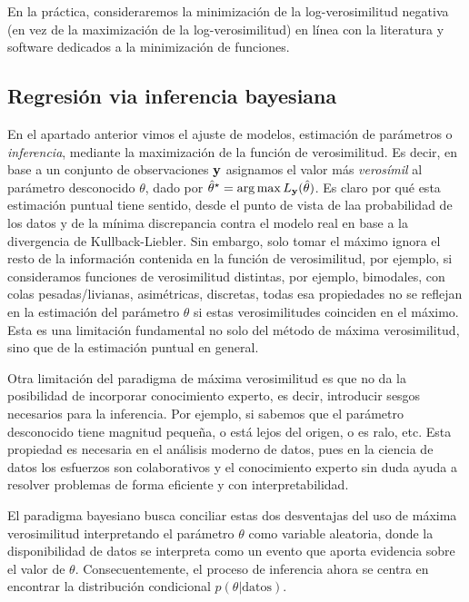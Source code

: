 En la práctica, consideraremos la minimización de la log-verosimilitud negativa (en vez de la maximización de la log-verosimilitud) en línea con la literatura y software dedicados a la minimización de funciones. 

\subsection{Regresión via inferencia bayesiana} 
\label{sub:inferencia_bayes}

En el apartado anterior vimos el ajuste de modelos, estimación de parámetros o \emph{inferencia}, mediante la maximización de la función de verosimilitud. Es decir, en base a un conjunto de observaciones $\mathbf{y}$ asignamos el valor más \emph{verosímil} al parámetro desconocido $\theta$, dado por $\hat\theta^\star = \arg\max  L_{\mathbf{y}}(\hat\theta)$. Es claro por qué esta estimación puntual tiene sentido, desde el punto de vista de laa probabilidad de los datos y de la mínima discrepancia contra el modelo real en base a la  divergencia de Kullback-Liebler. Sin embargo, solo tomar el máximo ignora el resto de la información contenida en la función de verosimilitud, por ejemplo, si consideramos funciones de verosimilitud distintas, por ejemplo, bimodales, con colas pesadas/livianas, asimétricas, discretas, todas esa propiedades no se reflejan en la estimación del parámetro $\theta$ si  estas verosimilitudes coinciden en el máximo. Esta es una limitación fundamental no solo del método de máxima verosimilitud, sino que de la estimación puntual en general. 

Otra limitación del paradigma de máxima verosimilitud es que no da la posibilidad de incorporar conocimiento experto, es decir, introducir sesgos necesarios para la inferencia. Por ejemplo, si sabemos que el parámetro desconocido tiene magnitud pequeña, o está lejos del origen, o es ralo, etc. Esta propiedad es necesaria en el análisis moderno de datos, pues en la ciencia de datos los esfuerzos son colaborativos y el conocimiento experto sin duda ayuda a resolver problemas de forma eficiente y con interpretabilidad. 

El paradigma bayesiano busca conciliar estas dos desventajas del uso de máxima verosimilitud interpretando el parámetro $\theta$ como variable aleatoria, donde la disponibilidad de datos se interpreta como un evento que aporta evidencia sobre el valor de $\theta$. Consecuentemente, el proceso de inferencia ahora se centra en encontrar la distribución condicional  $p(\theta|\text{datos})$.


